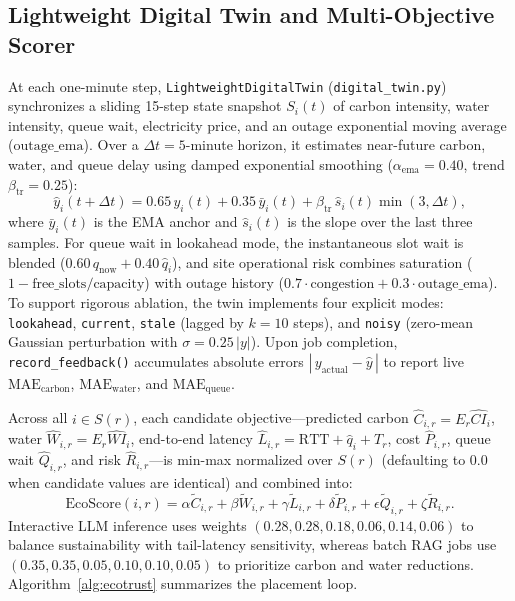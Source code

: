 \documentclass[conference]{IEEEtran}
\begin{document}
\subsection{Lightweight Digital Twin and Multi-Objective Scorer}
At each one-minute step, \texttt{LightweightDigitalTwin} (\texttt{digital\_twin.py}) synchronizes a sliding 15-step state snapshot $S_i(t)$ of carbon intensity, water intensity, queue wait, electricity price, and an outage exponential moving average ($\mathrm{outage\_ema}$). Over a $\Delta t = 5$-minute horizon, it estimates near-future carbon, water, and queue delay using damped exponential smoothing ($\alpha_{\mathrm{ema}}=0.40$, trend $\beta_{\mathrm{tr}}=0.25$):
\begin{equation}
\hat{y}_i(t+\Delta t) = 0.65\,y_i(t) + 0.35\,\bar{y}_i(t) + \beta_{\mathrm{tr}}\,\hat{s}_i(t)\min(3,\Delta t),
\end{equation}
where $\bar{y}_i(t)$ is the EMA anchor and $\hat{s}_i(t)$ is the slope over the last three samples. For queue wait in lookahead mode, the instantaneous slot wait is blended ($0.60\,q_{\mathrm{now}} + 0.40\,\hat{q}_i$), and site operational risk combines saturation ($1 - \text{free\_slots}/\text{capacity}$) with outage history ($0.7\cdot\text{congestion} + 0.3\cdot\mathrm{outage\_ema}$). To support rigorous ablation, the twin implements four explicit modes: \texttt{lookahead}, \texttt{current}, \texttt{stale} (lagged by $k=10$ steps), and \texttt{noisy} (zero-mean Gaussian perturbation with $\sigma = 0.25\,|y|$). Upon job completion, \texttt{record\_feedback()} accumulates absolute errors $|\,y_{\mathrm{actual}} - \hat{y}\,|$ to report live $\mathrm{MAE}_{\mathrm{carbon}}$, $\mathrm{MAE}_{\mathrm{water}}$, and $\mathrm{MAE}_{\mathrm{queue}}$.

Across all $i \in S(r)$, each candidate objective---predicted carbon $\hat{C}_{i,r}=E_r\hat{CI}_i$, water $\hat{W}_{i,r}=E_r\hat{WI}_i$, end-to-end latency $\hat{L}_{i,r}=\mathrm{RTT}+\hat{q}_i+T_r$, cost $\hat{P}_{i,r}$, queue wait $\hat{Q}_{i,r}$, and risk $\hat{R}_{i,r}$---is min-max normalized over $S(r)$ (defaulting to $0.0$ when candidate values are identical) and combined into:
\begin{equation}
\mathrm{EcoScore}(i,r) = \alpha \tilde{C}_{i,r} + \beta \tilde{W}_{i,r} + \gamma \tilde{L}_{i,r} + \delta \tilde{P}_{i,r} + \epsilon \tilde{Q}_{i,r} + \zeta \tilde{R}_{i,r}.
\end{equation}
Interactive LLM inference uses weights $(0.28,0.28,0.18,0.06,0.14,0.06)$ to balance sustainability with tail-latency sensitivity, whereas batch RAG jobs use $(0.35,0.35,0.05,0.10,0.10,0.05)$ to prioritize carbon and water reductions. Algorithm~\ref{alg:ecotrust} summarizes the placement loop.
\end{document}
